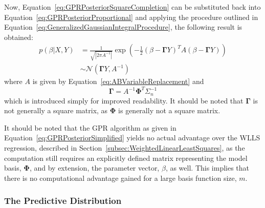 \documentclass{article}
\begin{document}
Now, Equation~\eqref{eq:GPRPosteriorSquareCompletion} can be substituted back into Equation~\eqref{eq:GPRPosteriorProportional} and applying the procedure outlined in Equation~\eqref{eq:GeneralizedGaussianIntegralProcedure}, the following result is obtained:
\begin{equation}
\label{eq:GPRPosteriorSimplified}
	\begin{aligned}
	p\!\left(\beta|X,Y\right) &= \frac{1}{\sqrt{\left|2 \pi A^{-1}\right|}} \exp\!\left(-\frac{1}{2} \left(\beta - \mathbf{\Gamma} Y\right)^T \! A \left(\beta - \mathbf{\Gamma} Y\right)\right) \\
	&\sim \mathcal{N}\!\left(\mathbf{\Gamma} Y, A^{-1}\right)
	\end{aligned}
\end{equation}
where $A$ is given by Equation~\eqref{eq:ABVariableReplacement} and
\begin{equation}
\label{eq:GammaVariableReplacement}
	\mathbf{\Gamma} = A^{-1} \mathbf{\Phi}^T \Sigma_n^{-1}
\end{equation}
which is introduced simply for improved readability. It should be noted that $\mathbf{\Gamma}$ is not generally a square matrix, as $\mathbf{\Phi}$ is generally not a square matrix.

It should be noted that the GPR algorithm as given in Equation~\eqref{eq:GPRPosteriorSimplified} yields no actual advantage over the WLLS regression, described in Section~\ref{subsec:WeightedLinearLeastSquares}, as the computation still requires an explicitly defined matrix representing the model basis, $\mathbf{\Phi}$, and by extension, the parameter vector, $\beta$, as well. This implies that there is no computational advantage gained for a large basis function size, $m$.

\subsubsection{The Predictive Distribution}
\label{subsubsec:GPRPredictiveDerivation}
\end{document}

